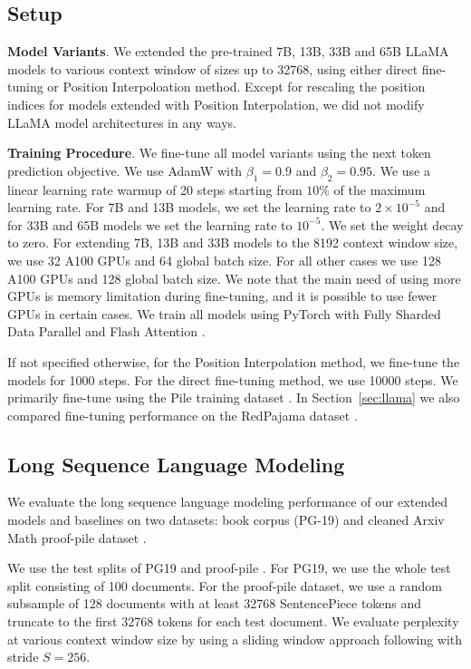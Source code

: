 \documentclass{article} %
\theoremstyle{definition}
\begin{document}
\subsection{Setup}
\label{sec:setup}

\textbf{Model Variants}. We extended the pre-trained 7B, 13B, 33B and 65B LLaMA models \citep{touvron2023llama} to various context window of sizes up to 32768,
using either direct fine-tuning or Position Interpoloation method.
Except for rescaling the position indices for models extended with Position Interpolation, we did not 
modify LLaMA model architectures \citep{touvron2023llama} in any ways.

\textbf{Training Procedure}. We fine-tune all model variants using the next token prediction objective.
We use AdamW \citep{loshchilov2018decoupled} with $\beta_1=0.9$ and $\beta_2=0.95$. 
We use a linear learning rate warmup of 20 steps starting from $10\%$ of the maximum learning rate.
For 7B and 13B models, we set the learning rate to $2\times 10^{-5}$ and for 33B and 65B models we set the learning rate to $10^{-5}$.
We set the weight decay to zero. 
For extending 7B, 13B and 33B models to the 8192 context window size, we use 32 A100 GPUs and 64 global batch size.
For all other cases we use 128 A100 GPUs and 128 global batch size.
We note that the main need of using more GPUs is memory limitation during fine-tuning, and it is possible
to use fewer GPUs in certain cases.
We train all models using PyTorch \citep{pytorch} with Fully Sharded Data Parallel \citep{zhao2023pytorch} and Flash Attention \citep{dao2022flashattention}. 

If not specified otherwise, for the Position Interpolation method, we fine-tune the models for 1000 steps. 
For the direct fine-tuning method, we use 10000 steps. 
We primarily fine-tune using the Pile training dataset \citep{pile}. In Section~\ref{sec:llama} we also compared
fine-tuning performance on the RedPajama dataset \citep{together2023redpajama}.

\subsection{Long Sequence Language Modeling}
\label{sec:perplexity}

We evaluate the long sequence language modeling performance of our extended models and baselines on two datasets: book corpus (PG-19) \citep{Rae2020Compressive} and cleaned Arxiv Math proof-pile dataset \citep{proofpile}. 

We use the test splits of PG19 \citep{Rae2020Compressive} and proof-pile \citep{proofpile}. 
For PG19, we use the whole test split consisting of 100 documents. 
For the proof-pile dataset, we use a random subsample of 128 documents with at least 32768 SentencePiece \citep{kudo-richardson-2018-sentencepiece} tokens and truncate to the first 32768 tokens for each test document. 
We evaluate perplexity at various context window size by using a sliding window approach following \citet{press2022train} with stride $S=256$.
\end{document}
